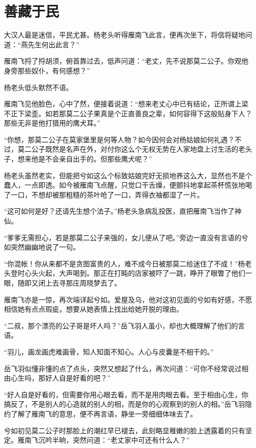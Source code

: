 \chapter{善藏于民}
\label{chap:cang-shan-yu-min}

大汉人最是迷信，平民尤甚。杨老头听得雁南飞此言，便再次坐下，将信将疑地问道：“燕先生何出此言？”

雁南飞捋了捋胡须，俯首靠过去，低声问道：“老丈，先不说那莫二公子。你观他身旁那些奴仆，有何感想？”

杨老头低头默然不语。

雁南飞见他脸色，心中了然，便接着说道：“想来老丈心中已有结论，正所谓上梁不正下梁歪。如若那莫二公子果真是个正直善良之辈，如何容得下这般贴身下人？那些无非是他打猎用的鹰犬耳。”

“你想，那莫二公子在莫家堡里是何等人物？如今因何会对杨姑娘如何礼遇？不过，莫二公子既然是名声在外，对付你这么个无权无势在人家地盘上讨生活的老头子，想来他是不会亲自出手的。但那些鹰犬呢？”

杨老头虽然老实，但能把兮如这么个标致姑娘完好无损地养这么大，显然也不是个蠢人，一点即透。如今被雁南飞点醒，只觉口干舌燥，便颤抖地拿起茶杯慌张地喝了一口，不想却被那粗糙的茶叶呛了一口，弄得衣袖都湿了一片。

“这可如何是好？还请先生想个法子。”杨老头急病乱投医，直把雁南飞当作了神仙。

“爹爹无需担心，若是那莫二公子来强的，女儿便从了吧。”旁边一直没有言语的兮如突然幽幽地说了一句。

“你混帐！你从来都不是贪图富贵的人，难不成今日被那莫二给迷住了不成！”杨老头登时心头火起，大声喝到。那正在打盹的店家被吓了一跳，睁开了眼瞥了他们一眼，随即又闭上去寻那庄周晓梦去了。

雁南飞亦是一惊，再次端详起兮如。爱屋及乌，他对这初见面的兮如有好感，不愿相信她有点点瑕疵，想要从她表情上找出给她开脱的理由。

“二叔，那个漂亮的公子哥是坏人吗？”岳飞羽人虽小，却也大概理解了他们的言语。

“羽儿，画龙画虎难画骨，知人知面不知心。人心与皮囊是不相干的。”

岳飞羽似懂非懂的点了点头，突然又想起了什么，再次问道：“可你不经常说过相由心生吗，那好人自是好看的吧？”

“好人自是好看的，但需要你用心眼去看，而不是用肉眼去看。至于相由心生，你搞反了，不是别人的心造就的别人的相，而是你的心观察到的别人的相。”岳飞羽隐约了解了雁南飞的意思，便不再言语，静坐一旁细细体味去了。

兮如初见莫二公子时那脸上的潮红早已褪去，此刻略显稚嫩的脸上透露着的只有坚定。雁南飞沉吟半晌，突然问道：“老丈家中可还有什么人？”
